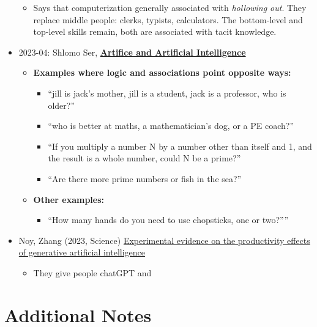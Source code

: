 \documentclass[
  11pt,
  letterpaper,
  DIV=11,
  numbers=noendperiod,
  oneside]{scrartcl}
\providecommand{\tightlist}{%
  \setlength{\itemsep}{0pt}\setlength{\parskip}{0pt}}\usepackage{longtable,booktabs,array}
\begin{document}
\begin{itemize}
  \begin{itemize}
  \tightlist
  \item
    Says that computerization generally associated with \emph{hollowing
    out}. They replace middle people: clerks, typists, calculators. The
    bottom-level and top-level skills remain, both are associated with
    tacit knowledge.
  \end{itemize}
\item
  2023-04: Shlomo Ser,
  \textbf{\href{https://medium.com/@shlomi.sher/on-artifice-and-intelligence-f19224281bee}{Artifice
  and Artificial Intelligence}}

  \begin{itemize}
  \tightlist
  \item
    \textbf{Examples where logic and associations point opposite ways:}

    \begin{itemize}
    \tightlist
    \item
      ``jill is jack's mother, jill is a student, jack is a professor,
      who is older?''
    \item
      ``who is better at maths, a mathematician's dog, or a PE coach?''
    \item
      ``If you multiply a number N by a number other than itself and 1,
      and the result is a whole number, could N be a prime?''
    \item
      ``Are there more prime numbers or fish in the sea?''
    \end{itemize}
  \item
    \textbf{Other examples:}

    \begin{itemize}
    \tightlist
    \item
      ``How many hands do you need to use chopsticks, one or two?''''
    \end{itemize}
  \end{itemize}
\item
  Noy, Zhang (2023, Science)
  \href{https://www.science.org/doi/10.1126/science.adh2586}{Experimental
  evidence on the productivity effects of generative artificial
  intelligence}

  \begin{itemize}
  \tightlist
  \item
    They give people chatGPT and
  \end{itemize}
\end{itemize}

\hypertarget{additional-notes-1}{%
\section{Additional Notes}\label{additional-notes-1}}
\end{document}
